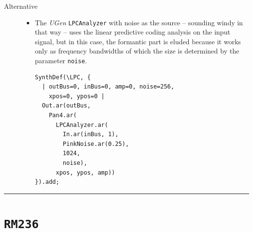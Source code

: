 \begin{description}
\begin{itemize}
\end{itemize}
\bigskip
\newpage
\setcounter{footnote}{0}
\item[Alternative] \hfill 
\begin{itemize}
\item[] The \textsl{UGen} \texttt{LPCAnalyzer} with noise as the source -- sounding windy in that way -- uses the linear predictive coding analysis
\citep{mak} %
on the input signal, but in this case, the formantic part is eluded because it works only as frequency bandwidths of which the size is determined by the parameter \texttt{noise}. 

\smallskip

\begin{lstlisting}
SynthDef(\LPC, {
  | outBus=0, inBus=0, amp=0, noise=256, 
    xpos=0, ypos=0 |
  Out.ar(outBus, 
    Pan4.ar(
      LPCAnalyzer.ar(
        In.ar(inBus, 1), 
        PinkNoise.ar(0.25), 
        1024, 
        noise), 
      xpos, ypos, amp))
}).add;
\end{lstlisting}
\end{itemize}
\end{description}

\bigskip

\begin{center}\rule{0.5\linewidth}{0.5pt}\end{center}

\bigskip


\section*{\texttt{RM236}}


\bigskip


